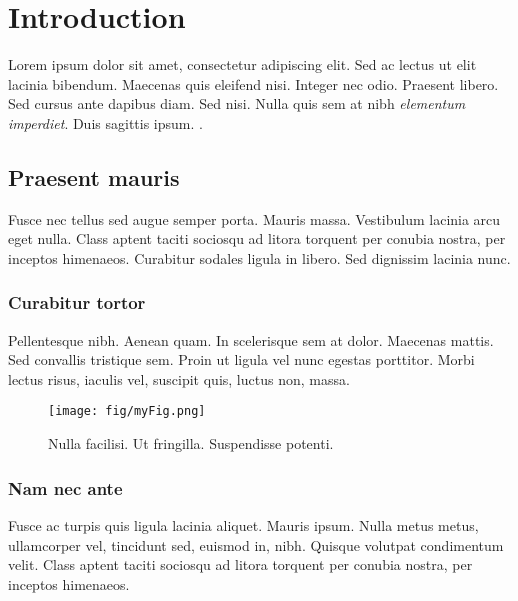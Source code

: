 
\chapter{Introduction}
\label{chap: intro}
Lorem ipsum dolor sit amet, consectetur adipiscing elit. Sed ac lectus ut elit lacinia bibendum. Maecenas quis eleifend nisi. Integer nec odio. Praesent libero. Sed cursus ante dapibus diam. Sed nisi. Nulla quis sem at nibh \textit{elementum imperdiet}. Duis sagittis ipsum. \citep{Nam_nec_ante}. 


\section{Praesent mauris}
Fusce nec tellus sed augue semper porta. Mauris massa. Vestibulum lacinia arcu eget nulla. Class aptent taciti sociosqu ad litora torquent per conubia nostra, per inceptos himenaeos. Curabitur sodales ligula in libero. Sed dignissim lacinia nunc. 

\subsection{Curabitur tortor}
Pellentesque nibh. Aenean quam. In scelerisque sem at dolor. Maecenas mattis. Sed convallis tristique sem. Proin ut ligula vel nunc egestas porttitor. Morbi lectus risus, iaculis vel, suscipit quis, luctus non, massa. 

\begin{figure}%
    \centering
    \texttt{[image: fig/myFig.png]}
    \caption{Nulla facilisi. Ut fringilla. Suspendisse potenti. 
            }
    \label{fig:lorem}
\end{figure}

\newpage
\subsection{Nam nec ante}
Fusce ac turpis quis ligula lacinia aliquet. Mauris ipsum. Nulla metus metus, ullamcorper vel, tincidunt sed, euismod in, nibh. Quisque volutpat condimentum velit. Class aptent taciti sociosqu ad litora torquent per conubia nostra, per inceptos himenaeos. 

